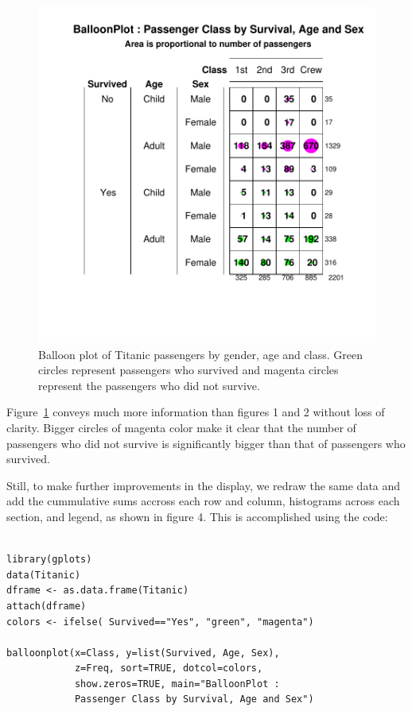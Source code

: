 \documentclass[a4paper]{report}
\begin{document}
\begin{article}
\begin{figure}
\includegraphics[width=\textwidth]{Figure3.pdf}
\caption{\label{figure:Figure3}
  Balloon plot of Titanic passengers by gender, age and class. Green
  circles represent passengers who survived and magenta circles
  represent the passengers who did not survive.}
\end{figure}

Figure~\ref{figure:Figure3} conveys much more information than
figures 1 and 2 without loss of clarity. Bigger circles of magenta
color make it clear that the number of passengers who did not
survive is significantly bigger than that of passengers who
survived.


Still, to make further improvements in the display, we redraw the
same data and add the cummulative sums accross each row and column,
 histograms across each section, and legend, as shown in figure 4.
  This is accomplished using the code:

{
\small
\begin{verbatim}

library(gplots)
data(Titanic)
dframe <- as.data.frame(Titanic) 
attach(dframe)
colors <- ifelse( Survived=="Yes", "green", "magenta")

balloonplot(x=Class, y=list(Survived, Age, Sex),
            z=Freq, sort=TRUE, dotcol=colors,
            show.zeros=TRUE, main="BalloonPlot :
            Passenger Class by Survival, Age and Sex")


\end{verbatim}}
\end{article}
\end{document}
